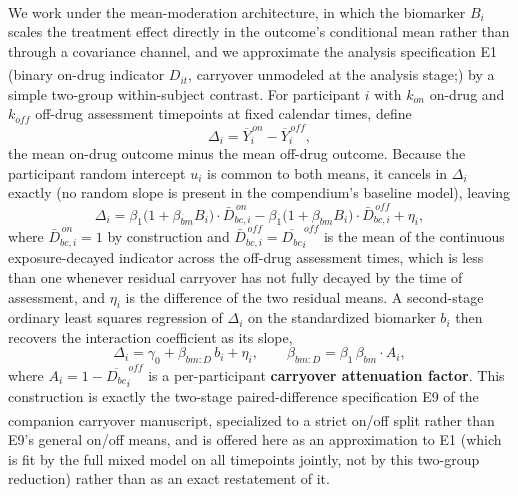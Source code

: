\documentclass[
  11pt,
]{article}
\begin{document}
We work under the mean-moderation architecture\textsuperscript{}, in which the biomarker \(B_i\) scales the
treatment effect directly in the outcome's conditional mean rather
than through a covariance channel, and we approximate the analysis
specification E1 (binary on-drug indicator \(D_{it}\), carryover
unmodeled at the analysis stage;\textsuperscript{}) by a simple
two-group within-subject contrast. For participant \(i\) with \(k_{on}\)
on-drug and \(k_{off}\) off-drug assessment timepoints at fixed
calendar times, define
\begin{equation}
\Delta_i = \overline{Y}_{i}^{\,on} - \overline{Y}_{i}^{\,off},
\label{eq:contrast}
\end{equation}
the mean on-drug outcome minus the mean off-drug outcome. Because the
participant random intercept \(u_i\) is common to both means, it
cancels in \(\Delta_i\) exactly (no random slope is present in the
compendium's baseline model), leaving
\begin{equation}
\Delta_i = \beta_1\big(1 + \beta_{bm} B_i\big)\cdot\bar D_{bc,i}^{\,on}
  - \beta_1\big(1+\beta_{bm}B_i\big)\cdot\bar D_{bc,i}^{\,off} + \eta_i,
\label{eq:delta-decomp}
\end{equation}
where \(\bar D_{bc,i}^{\,on}=1\) by construction and \(\bar
D_{bc,i}^{\,off} = \overline{D_{bc}}_i^{\,off}\) is the mean of the
continuous exposure-decayed indicator across the off-drug assessment
times, which is less than one whenever residual carryover has not
fully decayed by the time of assessment, and \(\eta_i\) is the
difference of the two residual means. A second-stage ordinary least
squares regression of \(\Delta_i\) on the standardized biomarker \(b_i\)
then recovers the interaction coefficient as its slope,
\begin{equation}
\Delta_i = \gamma_0 + \beta_{bm:D}\, b_i + \eta_i, \qquad
  \beta_{bm:D} = \beta_1\,\beta_{bm}\cdot A_i,
\label{eq:e9-like}
\end{equation}
where \(A_i = 1 - \overline{D_{bc}}_i^{\,off}\) is a per-participant
\textbf{carryover attenuation factor}. This construction is exactly the
two-stage paired-difference specification E9 of the companion
carryover manuscript\textsuperscript{}, specialized to a strict
on/off split rather than E9's general on/off means, and is offered
here as an approximation to E1 (which is fit by the full mixed model
on all timepoints jointly, not by this two-group reduction) rather
than as an exact restatement of it.
\end{document}
